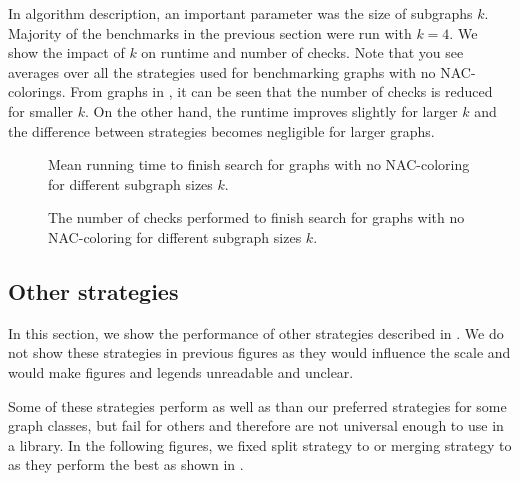 In \Subgraphs{} algorithm description, an important parameter was the size of subgraphs \( k \).
Majority of the benchmarks in the previous section were run with \( k = 4 \).
%
We show the impact of	\( k \) on runtime and number of checks.
Note that you see averages over all the strategies used for benchmarking
graphs with no NAC-colorings.
%
From graphs in ,
it can be seen that the number of checks is reduced for smaller \( k \).
On the other hand, the runtime improves slightly for larger \( k \)
and the difference between strategies becomes negligible for larger graphs.

\begin{figure}[thbp]
	\centering
	\scalebox{\BenchFigureScale}{}
	\caption[Mean runtime for graphs with no NAC-coloring]{
		Mean running time to finish search for graphs with no NAC-coloring for different subgraph sizes \( k \).}%
	\label{fig:graph_no_nac_coloring_first_runtime_subgraph_size}
\end{figure}%
\begin{figure}[thbp]
	\centering
	\scalebox{\BenchFigureScale}{}
	\caption[Checks performed for graphs with no NAC-coloring]{
		The number of checks performed to finish search for graphs with no NAC-coloring for different subgraph sizes \( k \).}%
	\label{fig:graph_no_nac_coloring_first_checks_subgraph_size}
\end{figure}%


\subsection{Other strategies}%
\label{sec:other_strategies}

In this section, we show the performance of other strategies described in .
We do not show these strategies in previous figures as they would influence
the scale and would make figures and legends unreadable and unclear.

Some of these strategies perform as well as
than our preferred strategies for some graph classes,
but fail for others and therefore are not universal enough to use in a library.
%
In the following figures, we fixed
split strategy to \Neighbors{} or merging strategy to \MergeLinear{}
as they perform the best as shown in .

